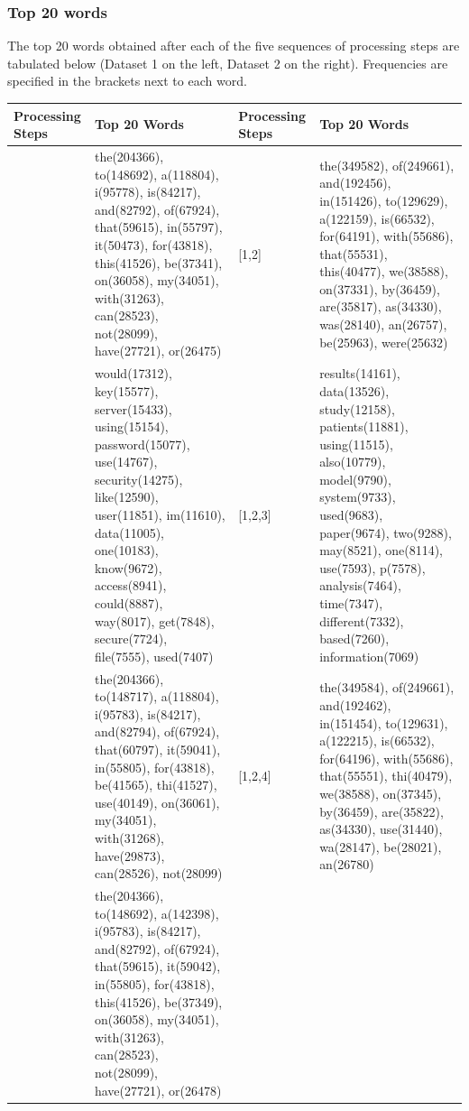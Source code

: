 \documentclass{article}
\begin{document}
\subsubsection{Top 20 words}
\begin{flushleft}
The top 20 words obtained after each of the five sequences of processing steps are tabulated below (Dataset 1 on the left, Dataset 2 on the right). Frequencies are specified in the brackets next to each word.
\begin{center}
\begin{tabular}{|p{}|p{}||p{}|p{}|}
\hline
Processing Steps & Top 20 Words & Processing Steps & Top 20 Words \\
\hline
\hline
[1,2] & the(204366), to(148692), a(118804), i(95778), is(84217), and(82792), of(67924), that(59615), in(55797), it(50473), for(43818), this(41526), be(37341), on(36058), my(34051), with(31263), can(28523), not(28099), have(27721), or(26475) &
[1,2] & the(349582), of(249661), and(192456), in(151426), to(129629), a(122159), is(66532), for(64191), with(55686), that(55531), this(40477), we(38588), on(37331), by(36459), are(35817), as(34330), was(28140), an(26757), be(25963), were(25632)\\
\hline
[1,2,3] & would(17312), key(15577), server(15433), using(15154), password(15077), use(14767), security(14275), like(12590), user(11851), im(11610), data(11005), one(10183), know(9672), access(8941), could(8887), way(8017), get(7848), secure(7724), file(7555), used(7407) &
[1,2,3] & results(14161), data(13526), study(12158), patients(11881), using(11515), also(10779), model(9790), system(9733), used(9683), paper(9674), two(9288), may(8521), one(8114), use(7593), p(7578), analysis(7464), time(7347), different(7332), based(7260), information(7069)\\
\hline
[1,2,4] & the(204366), to(148717), a(118804), i(95783), is(84217), and(82794), of(67924), that(60797), it(59041), in(55805), for(43818), be(41565), thi(41527), use(40149), on(36061), my(34051), with(31268), have(29873), can(28526), not(28099) &
[1,2,4] & the(349584), of(249661), and(192462), in(151454), to(129631), a(122215), is(66532), for(64196), with(55686), that(55551), thi(40479), we(38588), on(37345), by(36459), are(35822), as(34330), use(31440), wa(28147), be(28021), an(26780)\\
\hline
[1,2,5] & the(204366), to(148692), a(142398), i(95783), is(84217), and(82792), of(67924), that(59615), it(59042), in(55805), for(43818), this(41526), be(37349), on(36058), my(34051), with(31263), can(28523), not(28099), have(27721), or(26478) &

\end{tabular}
\end{center}
\end{flushleft}
\end{document}
